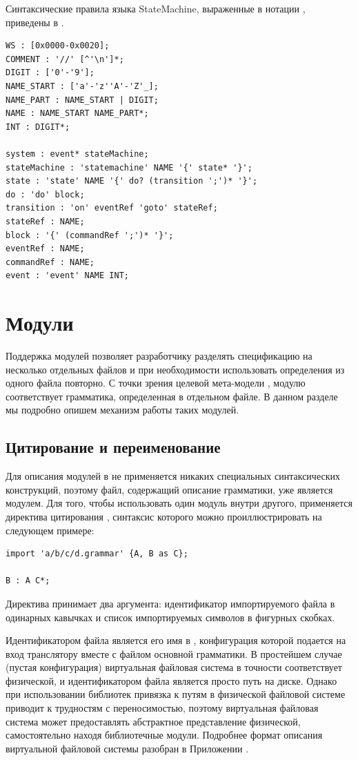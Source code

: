 Синтаксические правила языка StateMachine, выраженные в нотации , приведены в .

\begin{lstlisting}[xleftmargin=1cm,label=SMGram,caption=Грамматика языка StateMachine]
WS : [0x0000-0x0020];
COMMENT : '//' [^'\n']*;
DIGIT : ['0'-'9'];
NAME_START : ['a'-'z''A'-'Z'_];
NAME_PART : NAME_START | DIGIT;
NAME : NAME_START NAME_PART*;
INT : DIGIT*;

system : event* stateMachine;
stateMachine : 'statemachine' NAME '{' state* '}';
state : 'state' NAME '{' do? (transition ';')* '}';
do : 'do' block;
transition : 'on' eventRef 'goto' stateRef;
stateRef : NAME;
block : '{' (commandRef ';')* '}';
eventRef : NAME;
commandRef : NAME;
event : 'event' NAME INT;
\end{lstlisting}

\chapter{Модули}

Поддержка модулей позволяет разработчику разделять спецификацию на несколько отдельных файлов и при необходимости использовать определения из одного файла повторно.  С точки зрения целевой мета-модели , модулю соответствует грамматика, определенная в отдельном файле. В данном разделе мы подробно опишем механизм работы таких модулей.

\section{Цитирование и переименование}

Для описания модулей в  не применяется никаких специальных синтаксических конструкций, поэтому файл, содержащий описание грамматики, уже является модулем. Для того, чтобы использовать один модуль внутри другого, применяется директива цитирования , синтаксис которого можно проиллюстрировать на следующем примере:
\begin{lstlisting}
import 'a/b/c/d.grammar' {A, B as C};

B : A C*;
\end{lstlisting}  
Директива  принимает два аргумента: идентификатор импортируемого файла в одинарных кавычках и список импортируемых символов в фигурных скобках. 

Идентификатором файла является его имя в , конфигурация которой подается на вход транслятору  вместе с файлом основной грамматики. В простейшем случае (пустая конфигурация) виртуальная файловая система в точности соответствует физической, и идентификатором файла является просто путь на диске. Однако при использовании библиотек привязка к путям в физической файловой системе приводит к трудностям с переносимостью, поэтому виртуальная файловая система может предоставлять абстрактное представление физической, самостоятельно находя библиотечные модули. Подробнее формат описания виртуальной файловой системы разобран в Приложении .

